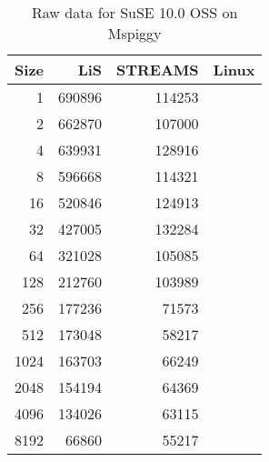 \documentclass[letterpaper,final,notitlepage,twocolumn,10pt,twoside]{article}
\begin{document}
\begin{appendix}
\begin{table}[hp]
\footnotesize
\setlength{\tabcolsep}{0.3em}
\setlength{\arraycolsep}{0.3em}
\begin{center}
\begin{tabular}{rrrr}\\
\hline
Size & LiS & STREAMS & Linux\\
\hline
\hline
1 & 690896 & 114253\\
2 & 662870 & 107000\\
4 & 639931 & 128916\\
8 & 596668 & 114321\\
16 & 520846 & 124913\\
32 & 427005 & 132284\\
64 & 321028 & 105085\\
128 & 212760 & 103989\\
256 & 177236 & 71573\\
512 & 173048 & 58217\\
1024 & 163703 & 66249\\
2048 & 154194 & 64369\\
4096 & 134026 & 63115\\
8192 & 66860 & 55217\\
\hline
\end{tabular}
\end{center}
\caption{Raw data for SuSE 10.0 OSS on Mspiggy}
\label{table:nbdata}
\normalsize
\end{table}

\end{appendix}
\end{document}
